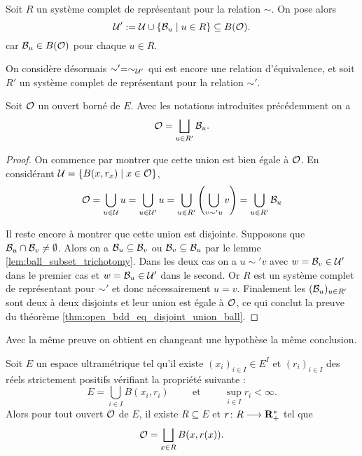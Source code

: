 \documentclass[../../rapport.tex]{subfiles}
\begin{document}
  \begin{definition}
    Soit $R$ un système complet de représentant pour la relation $\sim$.
    On pose alors
    $$\mathcal U' := \mathcal U \cup \left\{\mathcal{B}_u \mid u \in R\right\} \subseteq B(\mathcal{O}).$$
    car $\mathcal{B}_u \in B(\mathcal{O})$ pour chaque $u \in R$.
  \end{definition}

  On considère désormais $\sim' = \sim_{\mathcal U'}$ qui est encore une relation d'équivalence,
  et soit $R'$ un système complet de représentant pour la relation $\sim'$.

  \begin{theorem}
    Soit $\mathcal{O}$ un ouvert borné de $E$. Avec les notations introduites précédemment on a
    $$\mathcal{O} = \bigsqcup_{u\in R'}{\mathcal{B}_u}.$$
  \end{theorem}

  \begin{proof}
    On commence par montrer que cette union est bien égale à $\mathcal{O}$.
    En considérant $\mathcal U = \left\{B(x, r_x) \mid x \in \mathcal{O}\right\}$,
    \begin{align*}
      \mathcal{O} = \bigcup_{u \in \mathcal U}{u} = \bigcup_{u \in \mathcal U'}{u} = \bigcup_{u\in R'}{\left(\bigcup_{v \sim' u}{v}\right)}
				= \bigcup_{u\in R'}{\mathcal{B}_u}
    \end{align*}

    Il reste encore à montrer que cette union est disjointe.
    Supposons que $\mathcal{B}_u \cap \mathcal{B}_v \not= \emptyset$.
    Alors on a $\mathcal{B}_u \subseteq \mathcal{B}_v$ ou $\mathcal{B}_v \subseteq \mathcal{B}_u$ par le lemme \ref{lem:ball_subset_trichotomy}.
    Dans les deux cas on a $u \sim' v$ avec $w = \mathcal{B}_v \in \mathcal U'$ dans le premier cas et $w = \mathcal{B}_u \in \mathcal U'$ dans le second.
    Or $R$ est un système complet de représentant pour $\sim'$ et donc nécessairement $u = v$.
    Finalement les $(\mathcal{B}_u)_{u\in R'}$ sont deux à deux disjoints et leur union est égale à $\mathcal{O}$,
    ce qui conclut la preuve du théorème \ref{thm:open_bdd_eq_disjoint_union_ball}.
  \end{proof}

  Avec la même preuve on obtient en changeant une hypothèse la même conclusion.

  \begin{corollary}
    Soit $E$ un espace ultramétrique tel qu'il existe $(x_i)_{i\in I} \in E^I$ et $(r_i)_{i\in I}$ des réels strictement positifs vérifiant
    la propriété suivante :
    $$E = \bigcup_{i\in I}{B(x_i, r_i)} \hspace{1cm} \text{et} \hspace{1cm} \sup_{i\in I}{r_i} < \infty.$$
    Alors pour tout ouvert $\mathcal{O}$ de $E$, il existe $R \subseteq E$ et $r \colon R \longrightarrow \mathbf R^*_+$ tel que
    $$\mathcal{O} = \bigsqcup_{x\in R}{B(x, r(x))}.$$
  \end{corollary}
\end{document}
